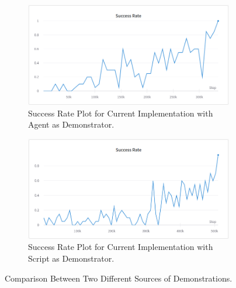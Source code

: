 \begin{figure}[h!]
     \centering
     \begin{subfigure}[b]{0.4\textwidth}
         \centering
         \includegraphics[width=\textwidth]{images/FPAPASR.png}
         \caption{Success Rate Plot for Current Implementation with Agent as Demonstrator.}
     \end{subfigure}
     \begin{subfigure}[b]{0.4\textwidth}
         \centering
         \includegraphics[width=\textwidth]{images/FPAPSSR.png}
         \caption{Success Rate Plot for Current Implementation with Script as Demonstrator.}
     \end{subfigure}
        \caption{Comparison Between Two Different Sources of Demonstrations.}
        \label{fig:CD}
\end{figure}

